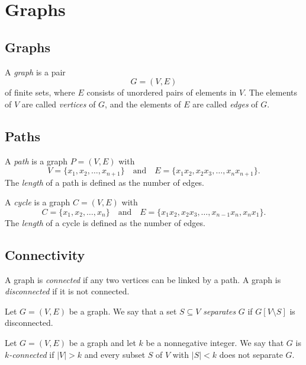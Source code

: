 \chapter{Graphs}
\section{Graphs}
\begin{definition}
  A \emph{graph} is a pair
  \begin{equation*}
    G = (V, E)
  \end{equation*}
  of finite sets, where $E$ consists of unordered pairs of elements in $V$.
  The elements of $V$ are called \emph{vertices} of $G$, and the elements of
  $E$ are called \emph{edges} of $G$.
\end{definition}

\section{Paths}
\begin{definition}
  A \emph{path} is a graph $P = (V, E)$ with
  \begin{equation*}
    V = \{x_1, x_2, \dots, x_{n+1}\}
    \quad \text{and} \quad
    E = \{x_1x_2, x_2x_3, \dots, x_nx_{n+1}\}.
  \end{equation*}
  The \emph{length} of a path is defined as the number of edges.
\end{definition}

\begin{definition}
  A \emph{cycle} is a graph $C = (V, E)$ with
  \begin{equation*}
    C = \{x_1, x_2, \dots, x_n\}
    \quad \text{and} \quad
    E = \{x_1x_2, x_2x_3, \dots, x_{n-1}x_n, x_nx_1\}.
  \end{equation*}
  The \emph{length} of a cycle is defined as the number of edges.
\end{definition}

\section{Connectivity}
\begin{definition}
  A graph is \emph{connected} if any two vertices can be linked by a path.
  A graph is \emph{disconnected} if it is not connected.
\end{definition}

\begin{definition}
  Let $G = (V, E)$ be a graph.
  We say that a set $S \subseteq V$ \emph{separates} $G$ if $G[V \setminus S]$
  is disconnected.
\end{definition}

\begin{definition}
  Let $G = (V, E)$ be a graph and let $k$ be a nonnegative integer.
  We say that $G$ is \emph{$k$-connected} if $|V| > k$ and every subset
  $S$ of $V$ with $|S| < k$ does not separate $G$.
\end{definition}